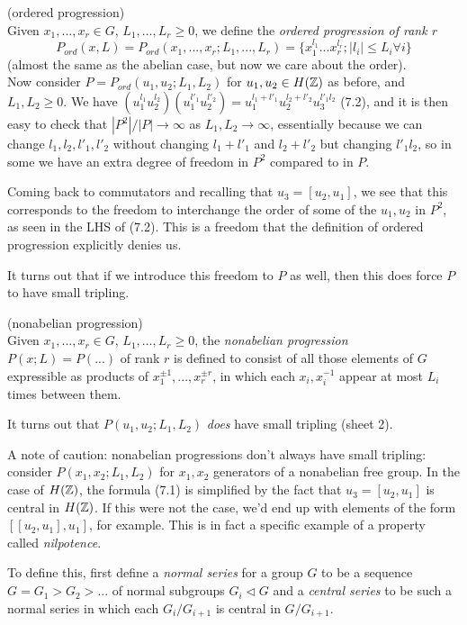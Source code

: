 \documentclass[a4paper]{article}
\begin{document}
\begin{defi} (ordered progression)\\
Given $x_1,...,x_r \in G$, $L_1,...,L_r \geq 0$, we define the \emph{ordered progression of rank $r$} 
\[
P_{ord} (x,L) = P_{ord}(x_1,...,x_r;L_1,...,L_r) = \{x_1^{l_1}...x_r^{l_r}; |l_i| \leq L_i \forall i\}
\]
(almost the same as the abelian case, but now we care about the order).\\
Now consider $P=P_{ord}(u_1,u_2;L_1,L_2)$ for $u_1,u_2 \in H(\mathbb{Z})$ as before, and $L_1,L_2 \geq 0$. We have $(u_1^{l_1} u_2^{l_2}) (u_1^{l'_1}u_2^{l'_2}) = u_1^{l_1+l'_1} u_2^{l_2+l'_2} u_3^{l'_1l_2}$ (7.2), and it is then easy to check that $|P^2|/|P| \to \infty$ as $L_1,L_2 \to \infty$, essentially because we can change $l_1,l_2,l'_1,l'_2$ without changing $l_1+l'_1$ and $l_2+l'_2$ but changing $l'_1l_2$, so in some we have an extra degree of freedom in $P^2$ compared to in $P$.

Coming back to commutators and recalling that $u_3 = [u_2,u_1]$, we see that this corresponds to the freedom to interchange the order of some of the $u_1,u_2$ in $P^2$, as seen in the LHS of (7.2). This is a freedom that the definition of ordered progression explicitly denies us.
\end{defi}

It turns out that if we introduce this freedom to $P$ as well, then this does force $P$ to have small tripling.

\begin{defi} (nonabelian progression)\\
Given $x_1,...,x_r \in G$, $L_1,...,L_r \geq 0$, the \emph{nonabelian progression} $P(x;L) = P(...)$ of rank $r$ is defined to consist of all those elements of $G$ expressible as products of $x_1^{\pm 1},...,x_r^{\pm r}$, in which each $x_i,x_i^{-1}$ appear at most $L_i$ times between them.

It turns out that $P(u_1,u_2;L_1,L_2)$ \emph{does} have small tripling (sheet 2).

A note of caution: nonabelian progressions don't always have small tripling: consider $P(x_1,x_2;L_1,L_2)$ for $x_1,x_2$ generators of a nonabelian free group. In the case of $H(\mathbb{Z})$, the formula (7.1) is simplified by the fact that $u_3=[u_2,u_1]$ is central in $H(\mathbb{Z})$. If this were not the case, we'd end up with elements of the form $[[u_2,u_1],u_1]$, for example. This is in fact a specific example of a property called \emph{nilpotence}.

To define this, first define a \emph{normal series} for a group $G$ to be a sequence $G = G_1 > G_2 > ...$ of normal subgroups $G_i \triangleleft G$ and a \emph{central series} to be such a normal series in which each $G_i/G_{i+1}$ is central in $G/G_{i+1}$.
\end{defi}
\end{document}
